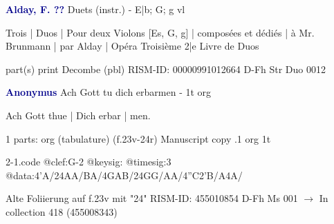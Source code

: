 \documentclass[twocolumn]{book}
\begin{document}
\newline \par \vspace{7pt} \textcolor{darkblue}{\textbf{Alday, F.  ??}}
\newline Duets (instr.) - E|b; G; g
 vl
\newline \begin{itshape}Trois | Duos | Pour deux Violons [Es, G, g] | composées et dédiés | à Mr. Brunmann | par Alday | Opéra Troisième 2|e Livre de Duos\end{itshape} 
\newline \textcolor{darkblue}{}  part(s)
\newline print
\newline Decombe  (pbl)
\newline RISM-ID: 00000991012664
\newline D-Fh  Str Duo 0012
\newline \par \vspace{7pt} \textcolor{darkblue}{\textbf{Anonymus  }}
\newline Ach Gott tu dich erbarmen - 1t
\newline org
\newline \begin{itshape}[f.23v, at left:] Ach Gott thue | Dich erbar | men.\end{itshape} 
\newline \textcolor{darkblue}{}  1 parts: org (tabulature)  (f.23v-24r)
\newline Manuscript copy
.1  org  1t  
\begin{filecontents*}{2-1.code}
@clef:G-2
@keysig:
@timesig:3
@data:4'A/24AA/BA/4GAB/24GG/AA/4''C2'B/A4A/
\end{filecontents*}
\newline
%

\newline Alte Foliierung auf f.23v mit "24"
\newline RISM-ID: 455010854
\newline D-Fh  Ms 001
\newline $\rightarrow$ In collection 418 (455008343)
      
\end{document}
